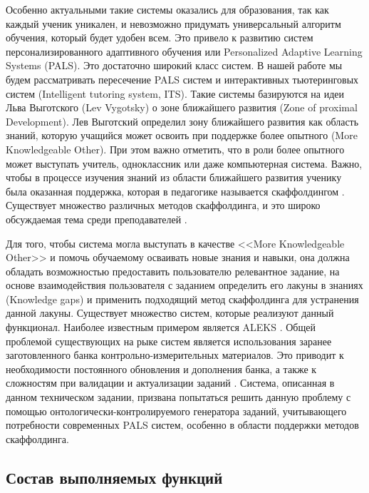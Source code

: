 \documentclass[a4paper,12pt,reqno]{article}
\begin{document}
    Особенно актуальными такие системы оказались для образования, так как каждый ученик уникален, и невозможно придумать универсальный алгоритм обучения, который будет удобен всем. Это привело к развитию систем персонализированного адаптивного обучения или Personalized Adaptive Learning Systems (PALS). Это достаточно широкий класс систем. В нашей работе мы будем рассматривать пересечение PALS систем и интерактивных тьютеринговых систем (Intelligent tutoring system, ITS). Такие системы базируются на идеи Льва Выготского (Lev Vygotsky) о зоне ближайшего развития \cite{introduction:ZPD_1} \cite{introduction:ZPD_2} (Zone of proximal Development). Лев Выготский определил зону ближайшего развития как область знаний, которую учащийся может освоить при поддержке более опытного (More Knowledgeable Other). При этом важно отметить, что в роли более опытного может выступать учитель, одноклассник или даже компьютерная система. Важно, чтобы в процессе изучения знаний из области ближайшего развития ученику была оказанная поддержка, которая в педагогике называется скаффолдингом \cite{scaffolding:Belland} \cite{scaffolding:cognitive}. Существует множество различных методов скаффолдинга, и это широко обсуждаемая тема среди преподавателей \cite{scaffolding:strategies_1} \cite{scaffolding:strategies_2}.

    Для того, чтобы система могла выступать в качестве <<More Knowledgeable Other>> и помочь обучаемому осваивать новые знания и навыки, она должна обладать возможностью предоставить пользователю релевантное задание, на основе взаимодействия пользователя с заданием определить его лакуны в знаниях (Knowledge gaps) и применить подходящий метод скаффолдинга для устранения данной лакуны.
    Существует множество систем, которые реализуют данный функционал. Наиболее известным примером является ALEKS \cite{competitors:ALEKS}. Общей проблемой существующих на рыке систем является использования заранее заготовленного банка контрольно-измерительных материалов. Это приводит к необходимости постоянного обновления и дополнения банка, а также к сложностям при валидации и актуализации заданий \cite{introduction:KnowledgeLearningSpaces}\cite{introduction:KnowledgeSpaces}.
    Система, описанная в данном техническом задании, призвана попытаться решить данную проблему с помощью онтологически-контролируемого генератора заданий, учитывающего потребности современных PALS систем, особенно в области поддержки методов скаффолдинга.

    \subsection{Состав выполняемых функций}
\end{document}
